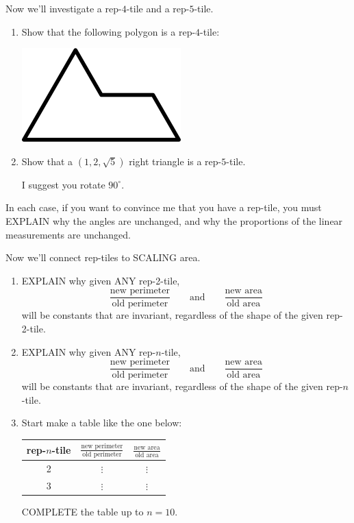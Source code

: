 \documentclass[handout,nooutcomes,noauthor]{ximera}
\begin{document}
\mynewpage


\begin{question}
  Now we'll investigate a rep-$4$-tile and a rep-$5$-tile.
  \begin{enumerate}
  \item Show that the following polygon is a rep-$4$-tile:
    \begin{center}
      \includegraphics[width=.2\textwidth]{sphinx.png}
    \end{center}
  \item Show that a $(1,2,\sqrt{5})$ right triangle is a
    rep-$5$-tile.
    \begin{hint}
      I suggest you rotate $90^\circ$.
    \end{hint}
  \end{enumerate}
  In each case, if you want to convince me that you have a rep-tile,
  you must EXPLAIN why the angles are unchanged, and why the
  proportions of the linear measurements are unchanged.
\end{question}

\mynewpage

\begin{question}
  Now we'll connect rep-tiles to SCALING area.
  \begin{enumerate}
    \item EXPLAIN why given ANY rep-2-tile,
      \[
      \frac{\text{new perimeter}}{\text{old perimeter}}\qquad\text{and}\qquad \frac{\text{new area}}{\text{old area}}
      \]
      will be constants that are invariant, regardless of the shape of
      the given rep-2-tile.
    \item EXPLAIN why given ANY rep-$n$-tile,
      \[
      \frac{\text{new perimeter}}{\text{old perimeter}}\qquad\text{and}\qquad \frac{\text{new area}}{\text{old area}}
      \]
      will be constants that are invariant, regardless of the shape of
      the given rep-$n$-tile.
    \item
      Start make a table like the one below:
      \begin{center}
        \begin{tabular}{c|c|c}
          rep-$n$-tile & $\frac{\text{new perimeter}}{\text{old perimeter}}$ & $\frac{\text{new area}}{\text{old area}}$  \\
          \hline\hline
          2 & $\vdots$  &  $\vdots$  \\ 
          3 & $\vdots$  &  $\vdots$  \\ 
        \end{tabular}
      \end{center}
      COMPLETE the table up to $n= 10$.
  \end{enumerate}
\end{question}
\end{document}
